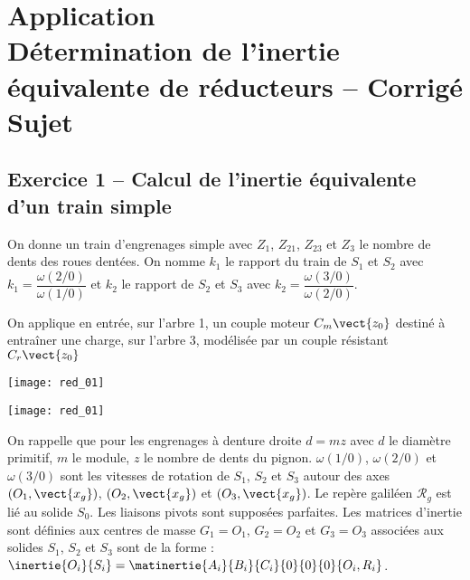 \chapter*{Application  \\ 
Détermination de l'inertie équivalente de réducteurs -- \ifprof Corrigé \else Sujet \fi}

\iflivret {} \else
\ifprof  {} \else \fi
\fi



\section*{Exercice 1 -- Calcul de l'inertie équivalente d'un train simple}

On donne un train d'engrenages simple avec $Z_1$, $Z_{21}$, $Z_{23}$ et $Z_3$ le nombre de dents des roues dentées. On nomme $k_1$ le rapport du train de $S_1$ et $S_2$ avec $k_1=\dfrac{\omega(2/0)}{\omega(1/0)}$ et  
$k_2$ le rapport de $S_2$ et $S_3$ avec $k_2=\dfrac{\omega(3/0)}{\omega(2/0)}$. 

On applique en entrée, sur l'arbre 1, un couple moteur $C_m\vect{z_0}$ destiné à entraîner une charge, sur l'arbre 3, modélisée par un couple résistant  $C_r\vect{z_0}$

\ifprof
\begin{center}
\texttt{[image: red\_01]}
\end{center}
\else
\begin{marginfigure}
\texttt{[image: red\_01]}
\end{marginfigure}
\fi
On rappelle que pour les engrenages à denture droite $d=mz$ avec $d$ le diamètre primitif, $m$ le module, $z$ le nombre de dents du pignon. $\omega(1/0)$, $\omega(2/0)$ et $\omega(3/0)$ sont les vitesses de rotation de $S_1$, $S_2$ et $S_3$ autour des axes $\left(O_1,\vect{x_g}\right)$, $\left(O_2,\vect{x_g}\right)$ et $\left(O_3,\vect{x_g}\right)$. Le repère galiléen $\mathcal{R}_g$ est lié au solide $S_0$. Les liaisons pivots sont supposées parfaites. Les matrices d'inertie sont définies aux centres de masse $G_1=O_1$, $G_2=O_2$ et $G_3=O_3$ associées aux solides $S_1$, $S_2$ et $S_3$ sont de la forme : $\inertie{O_i}{S_i}=\matinertie{A_i}{B_i}{C_i}{0}{0}{0}{O_i,R_i}$.

